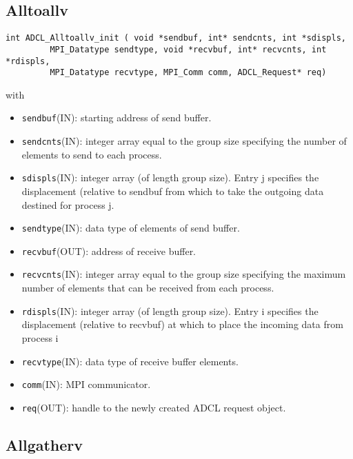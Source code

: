 \subsection{Alltoallv}

\begin{verbatim}
int ADCL_Alltoallv_init ( void *sendbuf, int* sendcnts, int *sdispls,
         MPI_Datatype sendtype, void *recvbuf, int* recvcnts, int *rdispls,
         MPI_Datatype recvtype, MPI_Comm comm, ADCL_Request* req)
\end{verbatim}
with
\begin{itemize}
\item {\tt sendbuf}(IN): starting address of send buffer.
\item {\tt sendcnts}(IN): integer array equal to the group size specifying the number of elements to send to each process.
\item {\tt sdispls}(IN): integer array (of length group size). Entry j specifies the displacement (relative to sendbuf from which to take the outgoing data destined for process j.
\item {\tt sendtype}(IN): data type of elements of send buffer.
\item {\tt recvbuf}(OUT): address of receive buffer.
\item {\tt recvcnts}(IN): integer array equal to the group size specifying the maximum number of elements that can be received from each process.
\item {\tt rdispls}(IN): integer array (of length group size). Entry i specifies the displacement (relative to recvbuf) at which to place the incoming data from process i
\item {\tt recvtype}(IN): data type of receive buffer elements.
\item {\tt comm}(IN): MPI communicator.
\item {\tt req}(OUT): handle to the newly created ADCL request object.
\end{itemize}

\subsection{Allgatherv}

